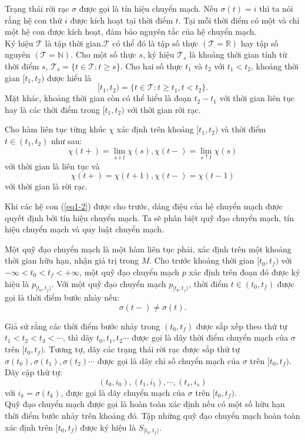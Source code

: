\documentclass[14pt,a4paper,oneside]{report}		%
\theoremstyle{definition}
\begin{document}
Trạng thái rời rạc $\sigma$ được gọi là tín hiệu chuyển mạch. Nếu $\sigma(t)=i$ thì ta nói rằng hệ con thứ $i$ được kích hoạt tại thời điểm $t$. Tại mỗi thời điểm có một và chỉ một hệ con được kích hoạt, đảm bảo nguyên tắc của hệ chuyển mạch.\\

Ký hiệu $\mathcal{T}$ là tập thời gian.$\mathcal{T}$ có thể đó là tập số thực $(\mathcal{T} = \mathbb{R})$ hay tập số nguyên $(\mathcal{T} = \mathbb{N})$. Cho một số thực $s$, ký hiệu $\mathcal{T}_s$ là khoảng thời gian tính từ thời điểm $s$, $\mathcal{T}_s=\{t\in\mathcal{T} : t\geq s\}$. Cho hai số thực $t_1$ và $t_2$ với $t_1 < t_2$, khoảng thời gian $[t_1, t_2)$ được hiểu là
$$[t_1, t_2)=\{t\in\mathcal{T}: t\geq t_1, t<t_2\}.$$
Mặt khác, khoảng thời gian còn có thể hiểu là đoạn $t_2 - t_1$ với thời gian liên tục hay là các thời điểm trong $[t_1,t_2)$ với thời gian rời rạc. 

Cho hàm liên tục từng khúc $\chi$ xác định trên khoảng $[t_1,t_2)$ và thời điểm $t \in (t_1,t_2)$ như sau:
$$\chi(t+)=\lim_{s\downarrow t}\chi(s), \chi(t-)=\lim_{s\uparrow t}\chi(s)$$
với thời gian là liên tục và
$$\chi(t+)=\chi(t+1), \chi(t-)=\chi(t-1)$$
với thời gian là rời rạc.

Khi các hệ con (\ref{eq1-2}) được cho trước, dáng điệu của hệ chuyển mạch được quyết định bởi tín hiệu chuyển mạch. Ta sẽ phân biệt quỹ đạo chuyển mạch, tín hiệu chuyển mạch và quy luật chuyển mạch.

Một quỹ đạo chuyển mạch là một hàm liên tục phải, xác định trên một khoảng thời gian hữu hạn, nhận giá trị trong $M$.
Cho trước khoảng thời gian $[t_0,t_f)$ với $-\infty < t_0 < t_f < +\infty$, một quỹ đạo chuyển mạch $p$ xác định trên đoạn đó được ký hiệu là $p_{[t_0,t_f)}$. Với một quỹ đạo chuyển mạch $p_{[t_0,t_f)}$, thời điểm $t\in (t_0,t_f)$ được gọi là thời điểm bước nhảy nếu:
$$\sigma(t-)\neq\sigma(t).$$

Giả sử rằng các thời điểm bước nhảy trong $(t_0, t_f)$ được sắp xếp theo thứ tự $t_1 < t_2 < t_3 < \cdots$, thì dãy $t_0,t_1,t_2\cdots$ được gọi là dãy thời điểm chuyển mạch của $\sigma$ trên $[t_0,t_f)$. Tương tự, dãy các trạng thái rời rạc được sắp thứ tự $\sigma(t_0),\sigma(t_1),\sigma(t_2)\cdots$ được gọi là dãy chỉ số chuyển mạch của $\sigma$ trên $[t_0,t_f)$. Dãy cặp thứ tự:
$$(t_0,i_0),(t_1,i_1),\cdots,(t_s,i_s)$$
với $i_k=\sigma(t_k)$, được gọi là dãy chuyển mạch của $\sigma$ trên $[t_0,t_f)$.\\
Quỹ đạo chuyển mạch được gọi là hoàn toàn xác định nếu có một số hữu hạn thời điểm bước nhảy trên khoảng đó. Tập những quỹ đạo chuyển mạch hoàn toàn xác định trên $[t_0,t_f)$ được ký hiệu là $S_{[t_0,t_f)}$.
\end{document}
